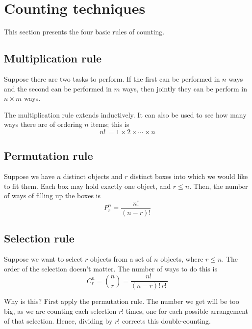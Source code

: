 \documentclass[11pt,letterpaper]{article}
\theoremstyle{definition}
\theoremstyle{remark}
\newcommand{\fact}{!\,}
\begin{document}
\section{Counting techniques}

This section presents the four basic rules of counting.

\subsection{Multiplication rule}
\label{sec:multiplication-rule}

Suppose there are two tasks to perform. If the first can be performed in $n$
ways and the second can be performed in $m$ ways, then jointly they can be
perform in $n \times m$ ways.

The multiplication rule extends inductively. It can also be used to see how
many ways there are of ordering $n$ items; this is
\begin{equation*}
    n\fact = 1 \times 2 \times \cdots \times n
\end{equation*}

\subsection{Permutation rule}
\label{sec:permutation-rule}

Suppose we have $n$ distinct objects and $r$ distinct boxes into which we would
like to fit them. Each box may hold exactly one object, and $r \leq n$. Then,
the number of ways of filling up the boxes is
\begin{equation}
    \label{eq:permutation-rule}
    P_r^n = \frac{n!}{(n-r)!}
\end{equation}

\subsection{Selection rule}
\label{sec:selection-rule}

Suppose we want to select $r$ objects from a set of $n$ objects, where
$r \leq n$. The order of the selection doesn't matter. The number of ways to do
this is
\begin{equation}
    \label{eq:selection-rule}
    C_r^n = {n \choose r} = \frac{n\fact}{(n-r)\fact r\fact}
\end{equation}

Why is this? First apply the permutation rule. The number we get will be too
big, as we are counting each selection $r!$ times, one for each possible
arrangement of that selection. Hence, dividing by $r!$ corrects this
double-counting.
\end{document}
